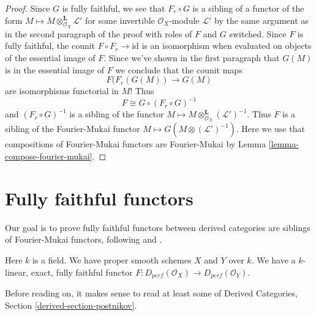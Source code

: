 \begin{proof}
\medskip\noindent
Since $G$ is fully faithful, we see that $F_r \circ G$
is a sibling of a functor of the form
$M \mapsto M \otimes^\mathbf{L}_{\mathcal{O}_X} \mathcal{L}'$
for some invertible $\mathcal{O}_X$-module $\mathcal{L}'$
by the same argument as in the second paragraph of the proof
with roles of $F$ and $G$ switched.
Since $F$ is fully faithful, the counit $F \circ F_r \to \text{id}$
is an isomorphism when evaluated on objects of the essential image of $F$.
Since we've shown in the first paragraph that $G(M)$ is in the
essential image of $F$ we conclude that the counit maps
$$
F(F_r(G(M)) \longrightarrow G(M) 
$$
are isomorphisms functorial in $M$! Thus
$$
F \cong G \circ (F_r \circ G)^{-1}
$$
and $(F_r \circ G)^{-1}$ is a sibling of the functor
$M \mapsto M \otimes_{\mathcal{O}_X}^\mathbf{L} (\mathcal{L}')^{-1}$.
Thus $F$ is a sibling of the Fourier-Mukai functor
$M \mapsto G(M  \otimes (\mathcal{L}')^{-1})$. Here we use that
compositions of Fourier-Mukai functors are Fourier-Mukai
by Lemma \ref{lemma-compose-fourier-mukai}.
\end{proof}








\section{Fully faithful functors}
\label{section-fully-faithful}

\noindent
Our goal is to prove fully faithful functors between derived categories
are siblings of Fourier-Mukai functors, following
\cite{Orlov-K3} and \cite{Ballard}.

\begin{situation}
\label{situation-fully-faithful}
Here $k$ is a field. We have proper smooth schemes $X$ and $Y$ over $k$.
We have a $k$-linear, exact, fully faithful functor
$F : D_{perf}(\mathcal{O}_X) \to D_{perf}(\mathcal{O}_Y)$.
\end{situation}

\noindent
Before reading on, it makes sense to read at least some of
Derived Categories, Section \ref{derived-section-postnikov}.

